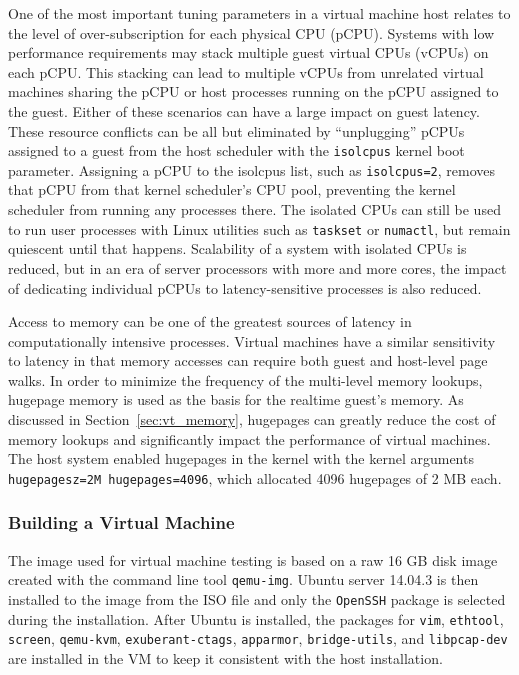 One of the most important tuning parameters in a virtual machine host relates to the level of over-subscription for each physical CPU (pCPU).
Systems with low performance requirements may stack multiple guest virtual CPUs (vCPUs) on each pCPU.  
This stacking can lead to multiple vCPUs from unrelated virtual machines sharing the pCPU or host processes running on the pCPU assigned to the guest.
Either of these scenarios can have a large impact on guest latency.
These resource conflicts can be all but eliminated by ``unplugging'' pCPUs assigned to a guest from the host scheduler with the \texttt{isolcpus} kernel boot parameter.
Assigning a pCPU to the isolcpus list, such as \texttt{isolcpus=2}, removes that pCPU from that kernel scheduler's CPU pool, preventing the kernel scheduler from running any processes there.
The isolated CPUs can still be used to run user processes with Linux utilities such as \texttt{taskset} or \texttt{numactl}, but remain quiescent until that happens.
Scalability of a system with isolated CPUs is reduced, but in an era of server processors with more and more cores, the impact of dedicating individual pCPUs to latency-sensitive processes is also reduced.

Access to memory can be one of the greatest sources of latency in computationally intensive processes.
Virtual machines have a similar sensitivity to latency in that memory accesses can require both guest and host-level page walks.
In order to minimize the frequency of the multi-level memory lookups, hugepage memory is used as the basis for the realtime guest's memory.  
As discussed in Section~\ref{sec:vt_memory}, hugepages can greatly reduce the cost of memory lookups and significantly impact the performance of virtual machines.
The host system enabled hugepages in the kernel with the kernel arguments \texttt{hugepagesz=2M hugepages=4096}, which allocated 4096 hugepages of 2 MB each.  


\subsubsection{Building a Virtual Machine} %
\label{ssub:build_vm}
The image used for virtual machine testing is based on a raw 16 GB disk image created with the command line tool \texttt{qemu-img}.
Ubuntu server 14.04.3 is then installed to the image from the ISO file and only the \texttt{OpenSSH} package is selected during the installation.  
After Ubuntu is installed, the packages for \texttt{vim}, \texttt{ethtool}, \texttt{screen}, \texttt{qemu-kvm}, \texttt{exuberant-ctags}, \texttt{apparmor}, \texttt{bridge-utils}, and \texttt{libpcap-dev} are installed in the VM to keep it consistent with the host installation.  

